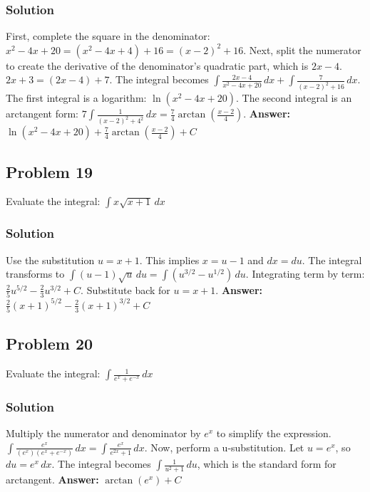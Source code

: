 \documentclass{article}
\begin{document}
\subsubsection*{Solution}
First, complete the square in the denominator: $ x^2 - 4x + 20 = (x^2 - 4x + 4) + 16 = (x-2)^2 + 16 $.
Next, split the numerator to create the derivative of the denominator's quadratic part, which is $2x-4$.
$ 2x+3 = (2x-4) + 7 $.
The integral becomes $ \int \frac{2x-4}{x^2 - 4x + 20} \,dx + \int \frac{7}{(x-2)^2 + 16} \,dx $.
The first integral is a logarithm: $ \ln(x^2 - 4x + 20) $.
The second integral is an arctangent form: $ 7 \int \frac{1}{(x-2)^2 + 4^2} \,dx = \frac{7}{4}\arctan\left(\frac{x-2}{4}\right) $.
\textbf{Answer:} $ \ln(x^2 - 4x + 20) + \frac{7}{4}\arctan\left(\frac{x-2}{4}\right) + C $

\subsection{Problem 19}
Evaluate the integral: $ \int x \sqrt{x+1} \,dx $
\subsubsection*{Solution}
Use the substitution $u = x+1$. This implies $x = u-1$ and $dx=du$.
The integral transforms to $ \int (u-1)\sqrt{u} \,du = \int (u^{3/2} - u^{1/2}) \,du $.
Integrating term by term: $ \frac{2}{5}u^{5/2} - \frac{2}{3}u^{3/2} + C $.
Substitute back for $u=x+1$.
\textbf{Answer:} $ \frac{2}{5}(x+1)^{5/2} - \frac{2}{3}(x+1)^{3/2} + C $

\subsection{Problem 20}
Evaluate the integral: $ \int \frac{1}{e^x + e^{-x}} \,dx $
\subsubsection*{Solution}
Multiply the numerator and denominator by $e^x$ to simplify the expression.
$ \int \frac{e^x}{(e^x)(e^x + e^{-x})} \,dx = \int \frac{e^x}{e^{2x} + 1} \,dx $.
Now, perform a u-substitution. Let $u = e^x$, so $du = e^x \,dx$.
The integral becomes $ \int \frac{1}{u^2+1} \,du $, which is the standard form for arctangent.
\textbf{Answer:} $ \arctan(e^x) + C $

\end{document}
